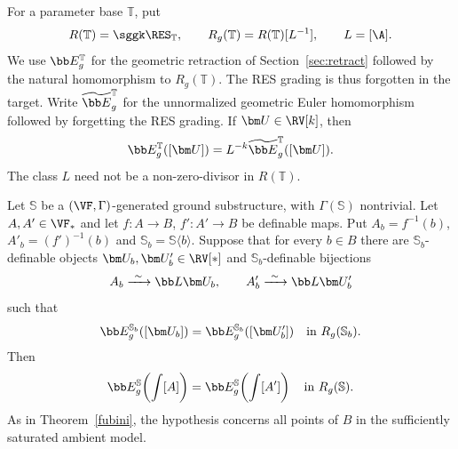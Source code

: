 \begin{nota}\label{nota:geometric:fubini:target}
For a parameter base $\mathbb T$, put
\[
 R(\mathbb T)=\sggk\RES_{\mathbb T},\qquad
 R_g(\mathbb T)=R(\mathbb T)[L^{-1}],\qquad L=[\A].
\]
We use $\bb E_g^{\mathbb T}$ for the geometric retraction of Section~\ref{sec:retract}
followed by the natural homomorphism to $R_g(\mathbb T)$.
The RES grading is thus forgotten in the target. Write $\widetilde{\bb E}_g^{\mathbb T}$
for the unnormalized geometric Euler homomorphism followed by forgetting
the RES grading. If $\bm U\in\RV[k]$, then
\begin{equation}\label{geometric:fubini:normalization}
 \bb E_g^{\mathbb T}([\bm U])=L^{-k}\widetilde{\bb E}_g^{\mathbb T}([\bm U]).
\end{equation}
The class $L$ need not be a non-zero-divisor in $R(\mathbb T)$.

\end{nota}

\begin{prop}\label{prop:geometric:fubini}
Let $\mathbb S$ be a $(\VF,\Gamma)$-generated ground substructure,
with $\Gamma(\mathbb S)$ nontrivial. Let $A,A'\in\VF_*$ and let
$f:A\to B$, $f':A'\to B$ be definable maps. Put
$A_b=f^{-1}(b)$, $A'_b=(f')^{-1}(b)$ and
$\mathbb S_b=\mathbb S\langle b\rangle$.
Suppose that for every $b\in B$ there are
$\mathbb S_b$-definable objects $\bm U_b,\bm U'_b\in\RV[*]$ and
$\mathbb S_b$-definable bijections
\[
 A_b\xrightarrow{\ \sim\ }\bb L\bm U_b,
 \qquad A'_b\xrightarrow{\ \sim\ }\bb L\bm U'_b
\]
such that
\[
 \bb E_g^{\mathbb S_b}([\bm U_b])
 =\bb E_g^{\mathbb S_b}([\bm U'_b])
 \quad\text{in }R_g(\mathbb S_b).
\]
Then
\[
 \bb E_g^{\mathbb S}\!\left(\int[A]\right)
 =\bb E_g^{\mathbb S}\!\left(\int[A']\right)
 \quad\text{in }R_g(\mathbb S).
\]
As in Theorem~\ref{fubini}, the hypothesis concerns all points of $B$ in the
sufficiently saturated ambient model.
\end{prop}

